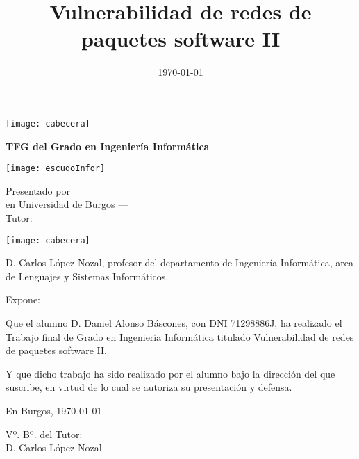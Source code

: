 \documentclass[a4paper,12pt,twoside]{memoir}
\title{Vulnerabilidad de redes de paquetes software II}
\author{\nombre}
\date{\today}
\makeatletter
\def\maketitle{
  \null
  \thispagestyle{empty}
\noindent\texttt{[image: cabecera]}\vspace{1cm}%
  \vfill
  \colorbox{cpardoBox}{%
    \begin{minipage}{.8\textwidth}
      \vspace{.5cm}\Large
      \begin{center}
      \textbf{TFG del Grado en Ingeniería Informática}\vspace{.6cm}\\
      \textbf{\LARGE\@title{}}
      \end{center}
      \vspace{.2cm}
    \end{minipage}

  }%
  \hfill\begin{minipage}{.20\textwidth}
    \texttt{[image: escudoInfor]}
  \end{minipage}
  \vfill
  \begin{center}%
  {%
    \noindent\LARGE
    Presentado por \@author{}\\ 
    en Universidad de Burgos --- \@date{}\\
    Tutor: \@tutor{}\\
  }%
  \end{center}%
  \null
  \cleardoublepage
  }
\newcommand{\nombre}{Daniel Alonso Báscones} %
\makeatother
\begin{document}
\maketitle


\newpage\null\thispagestyle{empty}\newpage


\thispagestyle{empty}


\noindent\texttt{[image: cabecera]}\vspace{1cm}

\noindent D. Carlos López Nozal, profesor del departamento de Ingeniería Informática, area de Lenguajes y Sistemas Informáticos.

\noindent Expone:

\noindent Que el alumno D. \nombre, con DNI 71298886J, ha realizado el Trabajo final de Grado en Ingeniería Informática titulado Vulnerabilidad de redes de
paquetes software II.

\noindent Y que dicho trabajo ha sido realizado por el alumno bajo la dirección del que suscribe, en virtud de lo cual se autoriza su presentación y defensa.

\begin{center} %
  En Burgos, {\large \today}
\end{center}

\vfill\vfill\vfill


\vfill

Vº. Bº. del Tutor:\\[2cm]
D. Carlos López Nozal


\newpage\null\thispagestyle{empty}\newpage
\end{document}
